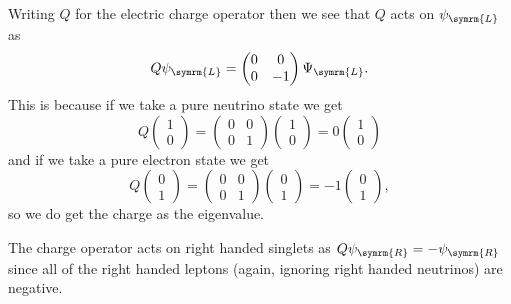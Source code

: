 \documentclass[fleqn]{NotesClass}
\newcommand{\Left}{\symrm{L}}
\newcommand{\Right}{\symrm{R}}
\begin{document}
    Writing \(Q\) for the electric charge operator then we see that \(Q\) acts on \(\psi_{\Left}\) as
    \begin{equation}
        Q\psi_{\Left} = 
        \begin{pmatrix}
            0 & 0\\
            0 & -1
        \end{pmatrix}
        \Psi_{\Left}.
    \end{equation}
    This is because if we take a pure neutrino state we get
    \begin{equation}
        Q
        \begin{pmatrix}
            1\\ 0
        \end{pmatrix}
        =
        \begin{pmatrix}
            0 & 0\\
            0 & 1
        \end{pmatrix}
        \begin{pmatrix}
            1\\ 0
        \end{pmatrix}
        = 0
        \begin{pmatrix}
            1\\ 0
        \end{pmatrix}
    \end{equation}
    and if we take a pure electron state we get
    \begin{equation}
        Q
        \begin{pmatrix}
            0\\ 1
        \end{pmatrix}
        =
        \begin{pmatrix}
            0 & 0\\
            0 & 1
        \end{pmatrix}
        \begin{pmatrix}
            0\\ 1
        \end{pmatrix}
        = -1
        \begin{pmatrix}
            0\\ 1
        \end{pmatrix}
        ,
    \end{equation}
    so we do get the charge as the eigenvalue.
    
    The charge operator acts on right handed singlets as \(Q\psi_{\Right} = -\psi_{\Right}\) since all of the right handed leptons (again, ignoring right handed neutrinos) are negative.
    
\end{document}
